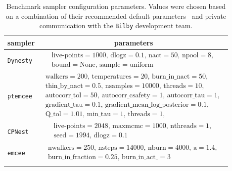 %
%
\begin{table}
\centering
\caption[Benchmark sampler configuration parameters.]{Benchmark sampler configuration parameters. Values were chosen based on a combination of their recommended default parameters~\cite{1811.02042} and private communication with the \texttt{Bilby} development team.}
\begin{minipage}{\linewidth}
\begin{tabular}[t]{lc}
\toprule
sampler & parameters \\
\hline
\texttt{Dynesty}~\cite{dynesty} & $\begin{array}{c} \text{live-points} =1000,\, \text{dlogz} =0.1,\, \text{nact} =50,\,  \text{npool} =8,\, \\ \text{bound} = \text{None},\, \text{sample} = \text{uniform} \end{array}$\\
\hline 
\texttt{ptemcee}~\cite{ptemcee} & $\begin{array}{c}\text{walkers}=200,\, 
\text{temperatures}=20,\, \text{burn}\_\text{in}\_\text{nact}=50,\, \\ \text{thin}\_\text{by}\_\text{nact}=0.5,\, 
\text{nsamples}=10000,\, \text{threads}=10,\, \\ \text{autocorr}\_\text{tol}=50,\, 
\text{autocorr}\_\text{c} \text{safety}=1,\, \text{autocorr}\_\text{tau}=1,\, \\ 
\text{gradient}\_\text{tau}=0.1,\, 
\text{gradient}\_\text{mean}\_\text{log}\_\text{posterior}=0.1,\, \\ \text{Q}\_\text{tol}=1.01,\, 
\text{min}\_\text{tau}=1,\, \text{threads}=1,\, \end{array}$ \\
\hline
\texttt{CPNest}~\cite{cpnest} & $\begin{array}{c} \text{live-points} =2048,\, \text{maxmcmc} =1000, \, \text{nthreads} = 1,\, \\
\text{seed} = 1994,\, \text{dlogz} =0.1 \end{array}$ \\
\hline
\texttt{emcee}~\cite{emcee} & $\begin{array}{c} \text{nwalkers} =250,\, \text{nsteps} =14000,\, \text{nburn}=4000,\, \text{a} = 1.4,\, \\
\text{burn}\_\text{in}\_\text{fraction}=0.25,\, \text{burn}\_\text{in}\_\text{act}\_=3 \end{array}$ \\
\botrule
\end{tabular}
\label{Tab:sampler_params}
\end{minipage}
\end{table}

